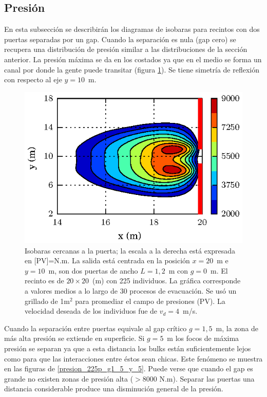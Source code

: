\subsection{Presión}

En esta subsección se describirán los diagramas de isobaras para recintos con dos puertas separadas por un gap. 
Cuando la separación es nula (gap cero) se recupera una distribución de presión similar a las distribuciones de la sección anterior. La presión máxima se da en los costados ya que en el medio se forma un canal por donde la gente puede transitar (figura \ref{presion_225p_g0}). Se tiene simetría de reflexión con respecto al eje $y=10$~m. 
\begin{figure}[H]
    \centering
    \includegraphics[scale=1]{figuras/press_225p_v4_g0.eps}
    \caption[width=5cm]{Isobaras cercanas a la puerta; la escala a la derecha está expresada en [PV]=N.m. La salida está centrada en la posición $x=20$~m e $y=10$~m, son dos puertas de ancho $L=1,2$~m con $g=0$~m. El recinto es de $20\times 20$~(m) con 225 individuos. La gráfica corresponde a valores medios a lo largo de 30 procesos de evacuación. Se usó un grillado de 1m$^2$ para promediar el campo de presiones (PV). La velocidad deseada de los individuos fue de $v_d=4$~m/s.}
    \label{presion_225p_g0}
\end{figure}

Cuando la separación entre puertas equivale al gap crítico $g=1,5$~m, la zona de más alta presión se extiende en superficie. Si $g=5$~m los focos de máxima presión se separan ya que a esta distancia los bulks están suficientemente lejos como para que las interacciones entre éstos sean chicas. Este fenómeno se muestra en las figuras de \ref{presion_225p_g1_5_y_5}. Puede verse que cuando el gap es grande no existen zonas de presión alta ($>$8000 N.m). Separar las puertas una distancia considerable produce una disminución general de la presión.    

